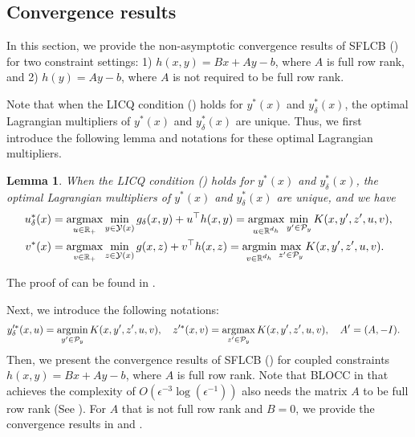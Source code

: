 \documentclass{article}
\newcommand{\Pc}{\mathcal{P}}
\newcommand{\Yc}{\mathcal{Y}}
\def\R{\mathbb{R}}
\newcommand{\argmin}{\mathop{\rm argmin}}
\newcommand{\argmax}{\mathop{\rm argmax}}
\theoremstyle{plain}
\newtheorem{lemma}[theorem]{Lemma}
\theoremstyle{definition}
\theoremstyle{remark}
\begin{document}
\subsection{Convergence results}
In this section, we provide the non-asymptotic convergence results of SFLCB () for two constraint settings: 1) $h(x,y)=Bx+Ay-b$, where $A$ is full row rank, and 2) $h(y)=Ay-b$, where $A$ is not required to be full row rank.

Note that when the LICQ condition () holds for $y^*(x)$ and $y^*_\delta(x)$, the optimal Lagrangian multipliers of $y^*(x)$ and $y^*_\delta(x)$ are unique. Thus, we first introduce the following lemma and notations for these optimal Lagrangian multipliers.

\begin{lemma}\label{lemma: multiplier}
When the LICQ  condition () holds for $y^*(x)$ and $y^*_\delta(x)$, the optimal Lagrangian multipliers of $y^*(x)$ and $y^*_\delta(x)$ are unique, and we have
    \begin{align*}
        u^*_\delta(x)&=\argmax_{u\in \R_+}\min_{y \in \Yc(x)}g_{\delta}(x,y)+u^\top h(x,y)=\argmax_{u\in \R^{d_h}}\min_{y' \in \Pc_y} K(x,y',z',u,v),\\
        v^*(x)&=\argmax_{v\in \R_+}\min_{z \in \Yc(x)}g(x,z)+v^\top h(x,z)=\argmin_{v\in \R^{d_h}}\max_{z' \in \Pc_y} K(x,y',z',u,v).
    \end{align*}
\end{lemma}
The proof of  can be found in . 

Next, we introduce the following notations:
\begin{align*}
    &y'^*_\delta(x,u)=\argmin_{y'\in\Pc_y} K(x,y',z',u, v), \quad z'^*(x,v)=\argmax_{z'\in \Pc_y} K(x,y',z',u, v), \quad A'=(A, -I).
\end{align*}
Then, we present the convergence
results of SFLCB () for coupled constraints $h(x,y)=Bx+Ay-b$, where $A$ is full row rank. Note that BLOCC in \cite{jiang2024primal} that achieves the complexity of $O(\epsilon^{-3}\log(\epsilon^{-1}))$ also needs the matrix $A$ to be full row rank (See ). For $A$ that is not full row rank and $B=0$, we provide the convergence results in  and .
\end{document}
